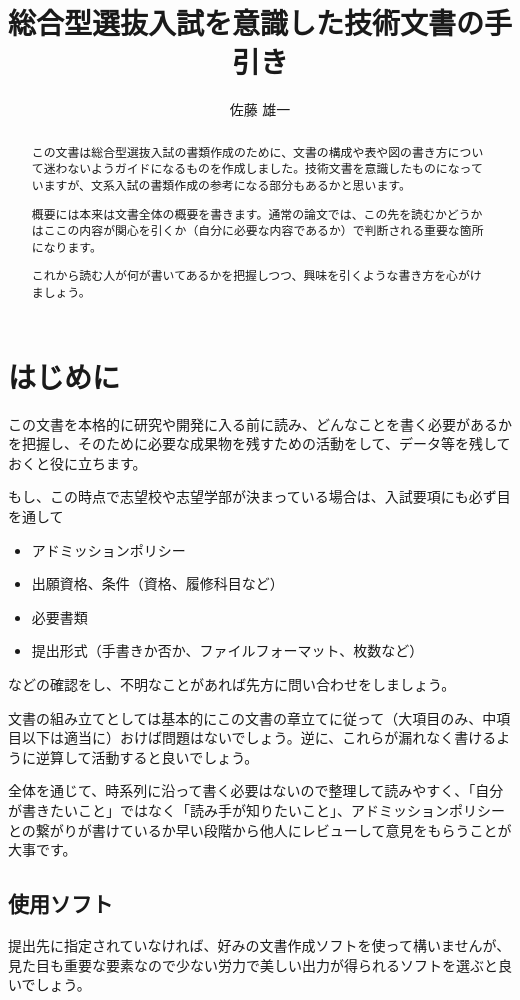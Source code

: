 \documentclass[dvipdfmx, a4paper]{jsarticle}
\title{総合型選抜入試を意識した技術文書の手引き}
\author{佐藤 雄一}
\begin{document}
\maketitle
\begin{abstract}
この文書は総合型選抜入試の書類作成のために、文書の構成や表や図の書き方について迷わないようガイドになるものを作成しました。技術文書を意識したものになっていますが、文系入試の書類作成の参考になる部分もあるかと思います。

概要には本来は文書全体の概要を書きます。通常の論文では、この先を読むかどうかはここの内容が関心を引くか（自分に必要な内容であるか）で判断される重要な箇所になります。

これから読む人が何が書いてあるかを把握しつつ、興味を引くような書き方を心がけましょう。
\end{abstract}

\section{はじめに}
この文書を本格的に研究や開発に入る前に読み、どんなことを書く必要があるかを把握し、そのために必要な成果物を残すための活動をして、データ等を残しておくと役に立ちます。

もし、この時点で志望校や志望学部が決まっている場合は、入試要項にも必ず目を通して
\begin{itemize}
    \item アドミッションポリシー
    \item 出願資格、条件（資格、履修科目など）
    \item 必要書類
    \item 提出形式（手書きか否か、ファイルフォーマット、枚数など）
\end{itemize}
などの確認をし、不明なことがあれば先方に問い合わせをしましょう。

文書の組み立てとしては基本的にこの文書の章立てに従って（大項目のみ、中項目以下は適当に）おけば問題はないでしょう。逆に、これらが漏れなく書けるように逆算して活動すると良いでしょう。

全体を通じて、時系列に沿って書く必要はないので整理して読みやすく、「自分が書きたいこと」ではなく「読み手が知りたいこと」、アドミッションポリシーとの繋がりが書けているか早い段階から他人にレビューして意見をもらうことが大事です。

\subsection{使用ソフト}
提出先に指定されていなければ、好みの文書作成ソフトを使って構いませんが、見た目も重要な要素なので少ない労力で美しい出力が得られるソフトを選ぶと良いでしょう。
\end{document}
